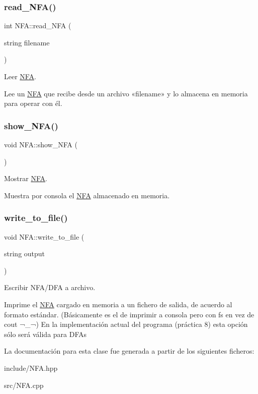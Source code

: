 \subsubsection{\texorpdfstring{read\+\_\+\+N\+F\+A()}{read\_NFA()}}
{\footnotesize\ttfamily int N\+F\+A\+::read\+\_\+\+N\+FA (\begin{DoxyParamCaption}\item[{string}]{filename }\end{DoxyParamCaption})}



Leer \mbox{\hyperlink{class_n_f_a}{N\+FA}}. 

Lee un \mbox{\hyperlink{class_n_f_a}{N\+FA}} que recibe desde un archivo «filename» y lo almacena en memoria para operar con él. \mbox{\label{class_n_f_a_a53a6b0ddcfb706dc4725cf2a6a8f2388}} 
\subsubsection{\texorpdfstring{show\+\_\+\+N\+F\+A()}{show\_NFA()}}
{\footnotesize\ttfamily void N\+F\+A\+::show\+\_\+\+N\+FA (\begin{DoxyParamCaption}{ }\end{DoxyParamCaption})}



Mostrar \mbox{\hyperlink{class_n_f_a}{N\+FA}}. 

Muestra por consola el \mbox{\hyperlink{class_n_f_a}{N\+FA}} almacenado en memoria. \mbox{\label{class_n_f_a_ac7c80c0e89655abde2de1c7c8c37db5e}} 
\subsubsection{\texorpdfstring{write\+\_\+to\+\_\+file()}{write\_to\_file()}}
{\footnotesize\ttfamily void N\+F\+A\+::write\+\_\+to\+\_\+file (\begin{DoxyParamCaption}\item[{string}]{output }\end{DoxyParamCaption})}



Escribir N\+F\+A/\+D\+FA a archivo. 

Imprime el \mbox{\hyperlink{class_n_f_a}{N\+FA}} cargado en memoria a un fichero de salida, de acuerdo al formato estándar. (Básicamente es el de imprimir a consola pero con fs en vez de cout ¬\+\_\+¬) En la implementación actual del programa (práctica 8) esta opción sólo será válida para D\+F\+As 

La documentación para esta clase fue generada a partir de los siguientes ficheros\+:\begin{DoxyCompactItemize}
\item 
include/N\+F\+A.\+hpp\item 
src/N\+F\+A.\+cpp\end{DoxyCompactItemize}
